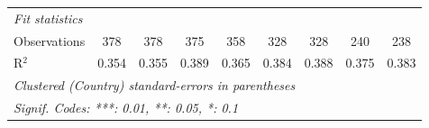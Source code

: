 \begin{tabular}{lcccccccc}
   \midrule \emph{Fit statistics}\\
   Observations                                                  & 378            & 378            & 375            & 358            & 328           & 328           & 240           & 238\\  
   R$^2$                                                         & 0.354          & 0.355          & 0.389          & 0.365          & 0.384         & 0.388         & 0.375         & 0.383\\  
   \midrule
   \multicolumn{9}{l}{\emph{Clustered (Country) standard-errors in parentheses}}\\
   \multicolumn{9}{l}{\emph{Signif. Codes: ***: 0.01, **: 0.05, *: 0.1}}\\
\end{tabular}
\par\endgroup


